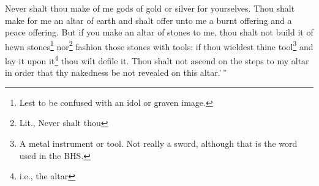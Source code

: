 \begin{enumerate}[align=center]
     Never shalt thou make of me gods of gold or silver for yourselves.%
     Thou shalt make for me an altar of earth and shalt offer unto me a burnt offering and a peace offering.%
     But if you make an altar of stones to me, thou shalt not build it of hewn stones\footnote{Lest to be confused with an idol or graven image.} nor\footnote{Lit., Never shalt thou} fashion those stones with tools: if thou wieldest thine tool\footnote{A metal instrument or tool. Not really a sword, although that is the word used in the BHS.} and lay it upon it\footnote{i.e., the altar} thou wilt defile it.%
     Thou shalt not ascend on the steps to my altar in order that thy nakedness be not revealed on this altar.'\,''%
\end{enumerate}
